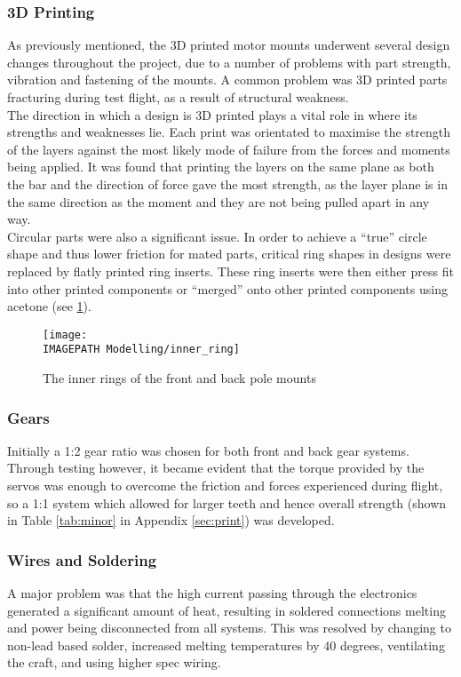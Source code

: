 \subsubsection*{3D Printing}
As previously mentioned, the 3D printed motor mounts underwent several design changes throughout the project, due to a number of problems with part strength, vibration and fastening of the mounts. A common problem was 3D printed parts fracturing during test flight, as a result of structural weakness.\\

The direction in which a design is 3D printed plays a vital role in where its strengths and weaknesses lie. Each print was orientated to maximise the strength of the layers against the most likely mode of failure from the forces and moments being applied. It was found that printing the layers on the same plane as both the bar and the direction of force gave the most strength, as the layer plane is in the same direction as the moment and they are not being pulled apart in any way.\\

Circular parts were also a significant issue. In order to achieve a ``true'' circle shape and thus lower friction for mated parts, critical ring shapes in designs were replaced by flatly printed ring inserts. These ring inserts were then either press fit into other printed components or ``merged'' onto other printed components using acetone (see \ref{fig:innerring}). 

\begin{figure}[!ht]
	\centering
	\texttt{[image: \\IMAGEPATH Modelling/inner\_ring]}
	\caption{The inner rings of the front and back pole mounts}
	\label{fig:innerring}
\end{figure}

\subsubsection*{Gears}
Initially a 1:2 gear ratio was chosen for both front and back gear systems. Through testing however, it became evident that the torque provided by the servos was enough to overcome the friction and forces experienced during flight, so a 1:1 system which allowed for larger teeth and hence overall strength (shown in Table \ref{tab:minor} in Appendix \ref{sec:print}) was developed.

\subsubsection*{Wires and Soldering}
A major problem was that the high current passing through the electronics generated a significant amount of heat, resulting in soldered connections melting and power being disconnected from all systems. This was resolved by changing to non-lead based solder, increased melting temperatures by 40 degrees, ventilating the craft, and using higher spec wiring. 

